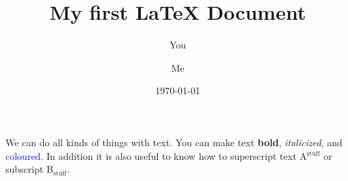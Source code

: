 \documentclass[a4paper]{article}
\begin{document}
\title{My first LaTeX Document}
\author{You \and Me}
\date{\today}
\maketitle 

We can do all kinds of things with text. You can make text \textbf{bold}, \emph{italicized}, and \textcolor{blue}{coloured}. In addition it is also useful to know how to superscript text A${}^{\text{stuff}}$ or subscript B${}_{\text{stuff}}$. 
\end{document}
